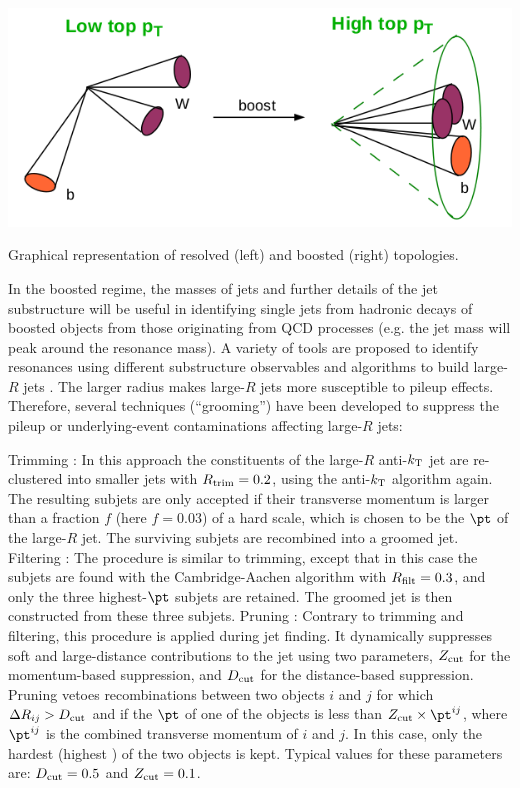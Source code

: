 \bfig[t!]
\includegraphics[width=\textwidth]{figures/Objects/cartoonboost.png}
\captionsetup{width=0.85\textwidth} \caption{\small Graphical representation of resolved (left) and boosted (right) topologies.}
\label{fig:obj:jet:boostcart}
\efig

In the boosted regime, the masses of jets and further details of the jet substructure will be useful in identifying single jets from hadronic decays of boosted objects from those originating from QCD processes (e.g. the jet mass will peak around the resonance mass). A variety of tools are proposed to identify resonances using different substructure observables and algorithms to build large-$R$ jets \cite{Altheimer:2013yza}. The larger radius makes large-$R$ jets more susceptible to pileup effects. Therefore, several techniques (``grooming'') have been developed to suppress the pileup or underlying-event contaminations affecting large-$R$ jets:

\bi
\ib Trimming \cite{Krohn:2009th}: In this approach the constituents of the large-$R$ anti-$k_{\rm T}$ jet are re-clustered  into smaller jets with $R_{\rm trim}= 0.2$, using the anti-$k_{\rm T}$ algorithm again. The resulting subjets are only accepted if their transverse momentum is larger than a fraction $f$ (here $f= 0.03$) of a hard scale, which is chosen to be the $\pt$ of the large-$R$ jet. The surviving subjets are recombined into a groomed jet.
\ib Filtering \cite{Butterworth:2008iy}: The procedure is similar to trimming, except that in this case the subjets are found with the Cambridge-Aachen algorithm \cite{antikt} with $R_{\rm filt}= 0.3$, and only the three highest-$\pt$ subjets are  retained.  The groomed jet is then constructed from these three subjets.
\ib Pruning \cite{Ellis:2009su}: Contrary to trimming and filtering, this procedure is applied during jet finding.  It dynamically suppresses soft and large-distance contributions to the jet
using two parameters, $Z_{\rm cut}$ for the momentum-based suppression, and $D_{\rm cut}$ for the distance-based suppression. Pruning vetoes recombinations between two objects $i$ and $j$ for which $\Delta R_{ij}> D_{\rm cut}$ and if the $\pt$ of one of the objects is less than $Z_{\rm cut}\times \pt^{ij}$, where $\pt^{ij}$ is the combined transverse momentum of $i$ and $j$. In this case, only the hardest (highest \pt) of the two objects is kept. Typical values for these parameters are:  $D_{\rm cut}=0.5$ and $Z_{\rm cut}=0.1$.
\ei

